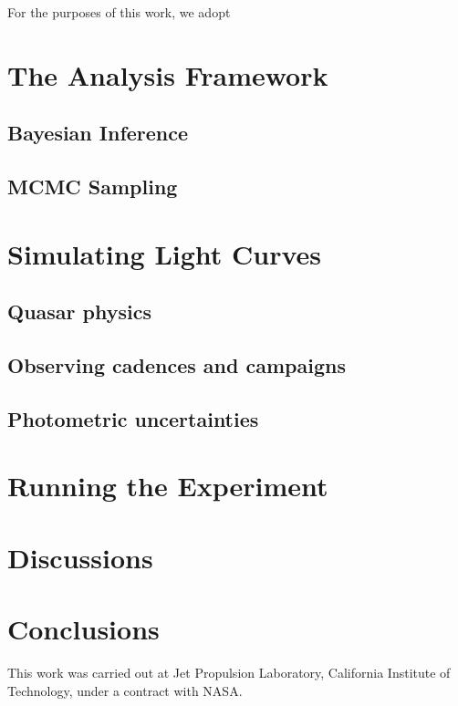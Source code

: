 \documentclass{emulateapj}
\begin{document}
For the purposes of this work, we adopt 


\section{The Analysis Framework}\label{}
\subsection{Bayesian Inference}\label{}
\subsection{MCMC Sampling}\label{}

\section{Simulating Light Curves}\label{}
\subsection{Quasar physics}\label{}
\subsection{Observing cadences and campaigns}\label{}
\subsection{Photometric uncertainties}\label{}

\section{Running the Experiment}\label{}


\section{Discussions}\label{sec:disc}

\section{Conclusions}\label{sec:conc}

\acknowledgements

This work was carried out at Jet Propulsion Laboratory, California
Institute of Technology, under a contract with NASA.



\end{document}
